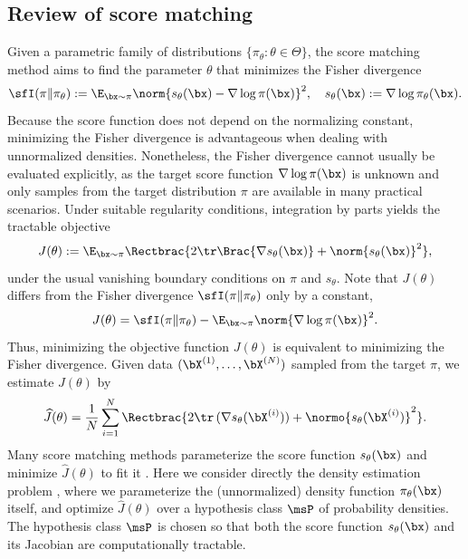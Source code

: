 \documentclass[11pt]{article}
\begin{document}
\subsection{Review of score matching}
\label{sec:SM_review}

Given a parametric family of distributions $\{\pi_\theta:\theta \in\Theta\}$, the score matching method aims to find the parameter $\theta$ that minimizes the Fisher divergence
\begin{equation}
    \sfI(\pi\|\pi_\theta) := \E_{\bx \sim \pi} \norm{ s_\theta(\bx) - \nabla \log\pi (\bx) }^2, \quad s_\theta(\bx) := \nabla \log \pi_\theta(\bx).
\end{equation}
Because the score function does not depend on the normalizing constant, minimizing the Fisher divergence is advantageous when dealing with unnormalized densities.
Nonetheless, the Fisher divergence cannot usually be evaluated explicitly, as the target score function $\nabla \log\pi(\bx)$ is unknown and only samples from the target distribution $\pi$ are available in many practical scenarios.
%
Under suitable regularity conditions, integration by parts yields the tractable objective
\begin{equation}
\label{eqn:SM_loss}
    J(\theta) := \E_{\bx \sim \pi} \Rectbrac{ 2 \tr \Brac{ \nabla s_\theta(\bx) } + \norm{s_\theta(\bx)}^2 },
\end{equation}
under the usual vanishing boundary conditions on $\pi$ and $s_\theta$.
Note that $J(\theta)$ differs from the Fisher divergence $\sfI(\pi\|\pi_\theta)$ only by a constant,
\begin{equation}
\label{eqn:SM_equiv}
    J(\theta) = \sfI(\pi\|\pi_\theta) - \E_{\bx \sim \pi} \norm{ \nabla \log \pi(\bx) }^2.
\end{equation}
Thus, minimizing the objective function $J(\theta)$ is equivalent to minimizing the Fisher divergence.
%
Given data $(\bX^{(1)},\dots,\bX^{(N)})$ sampled from the target $\pi$, we estimate $J(\theta)$ by
\begin{equation}
    \widehat{J}(\theta) = \frac{1}{N} \sum_{i=1}^N \Rectbrac{ 2 \tr\, (\nabla s_\theta(\bX^{(i)})) +  \normo{ s_\theta(\bX^{(i)})}^2 }. 
\end{equation}
Many score matching methods parameterize the score function $s_\theta(\bx)$ and minimize $\widehat{J}(\theta)$ to fit it \cite{JMLR:v6:hyvarinen05a,NEURIPS2019_3001ef25}.
%
Here we consider directly the density estimation problem \cite{NIPS2015_83adc922,JMLR:v18:16-011}, where we parameterize the (unnormalized) density function $\pi_\theta(\bx)$ itself, and optimize $\widehat{J}(\theta)$ over a hypothesis class $\msP$ of probability densities.
%
The hypothesis class $\msP$ is chosen so that both the score function $s_\theta(\bx)$ and its Jacobian are computationally tractable.
\end{document}
